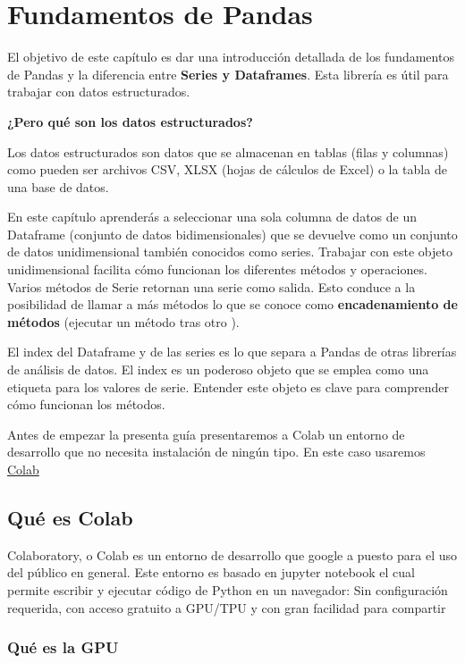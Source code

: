 \documentclass[
]{book}
\begin{document}
\hypertarget{intro}{%
\chapter{Fundamentos de Pandas}\label{intro}}

El objetivo de este capítulo es dar una introducción detallada de los fundamentos de Pandas y la diferencia entre \textbf{Series y Dataframes}. Esta librería es útil para trabajar con datos estructurados.

\textbf{¿Pero qué son los datos estructurados?}

Los datos estructurados son datos que se almacenan en tablas (filas y columnas) como pueden ser archivos CSV, XLSX (hojas de cálculos de Excel) o la tabla de una base de datos.

En este capítulo aprenderás a seleccionar una sola columna de datos de un Dataframe (conjunto de datos bidimensionales) que se devuelve como un conjunto de datos unidimensional también conocidos como series. Trabajar con este objeto unidimensional facilita cómo funcionan los diferentes métodos y operaciones. Varios métodos de Serie retornan una serie como salida. Esto conduce a la posibilidad de llamar a más métodos lo que se conoce como \textbf{encadenamiento de métodos} (ejecutar un método tras otro ).

El index del Dataframe y de las series es lo que separa a Pandas de otras librerías de análisis de datos. El index es un poderoso objeto que se emplea como una etiqueta para los valores de serie. Entender este objeto es clave para comprender cómo funcionan los métodos.

Antes de empezar la presenta guía presentaremos a Colab un entorno de desarrollo que no necesita instalación de ningún tipo. En este caso usaremos \href{https://colab.research.google.com/notebooks/intro.ipynb\#recent=true}{Colab}

\hypertarget{quuxe9-es-colab}{%
\section{Qué es Colab}\label{quuxe9-es-colab}}

Colaboratory, o Colab es un entorno de desarrollo que google a puesto para el uso del público en general. Este entorno es basado en jupyter notebook el cual permite escribir y ejecutar código de Python en un navegador: Sin configuración requerida, con acceso gratuito a GPU/TPU y con gran facilidad para compartir

\hypertarget{quuxe9-es-la-gpu}{%
\subsection{Qué es la GPU}\label{quuxe9-es-la-gpu}}
\end{document}
